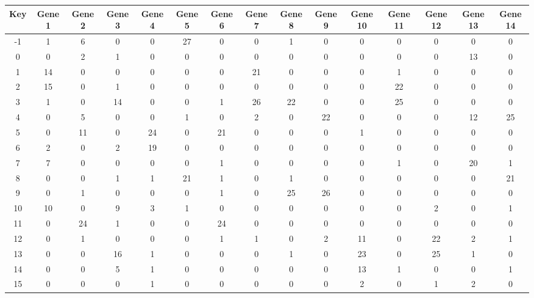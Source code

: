 \begin{tabular}{|c|c|c|c|c|c|c|c|c|c|c|c|c|c|c|}
\hline
Key & Gene 1 & Gene 2 & Gene 3 & Gene 4 & Gene 5 & Gene 6 & Gene 7 & Gene 8 & Gene 9 & Gene 10 & Gene 11 & Gene 12 & Gene 13 & Gene 14 \\
\hline
-1 & 1 & 6 & 0 & 0 & 27 & 0 & 0 & 1 & 0 & 0 & 0 & 0 & 0 & 0 \\
0 & 0 & 2 & 1 & 0 & 0 & 0 & 0 & 0 & 0 & 0 & 0 & 0 & 13 & 0 \\
1 & 14 & 0 & 0 & 0 & 0 & 0 & 21 & 0 & 0 & 0 & 1 & 0 & 0 & 0 \\
2 & 15 & 0 & 1 & 0 & 0 & 0 & 0 & 0 & 0 & 0 & 22 & 0 & 0 & 0 \\
3 & 1 & 0 & 14 & 0 & 0 & 1 & 26 & 22 & 0 & 0 & 25 & 0 & 0 & 0 \\
4 & 0 & 5 & 0 & 0 & 1 & 0 & 2 & 0 & 22 & 0 & 0 & 0 & 12 & 25 \\
5 & 0 & 11 & 0 & 24 & 0 & 21 & 0 & 0 & 0 & 1 & 0 & 0 & 0 & 0 \\
6 & 2 & 0 & 2 & 19 & 0 & 0 & 0 & 0 & 0 & 0 & 0 & 0 & 0 & 0 \\
7 & 7 & 0 & 0 & 0 & 0 & 1 & 0 & 0 & 0 & 0 & 1 & 0 & 20 & 1 \\
8 & 0 & 0 & 1 & 1 & 21 & 1 & 0 & 1 & 0 & 0 & 0 & 0 & 0 & 21 \\
9 & 0 & 1 & 0 & 0 & 0 & 1 & 0 & 25 & 26 & 0 & 0 & 0 & 0 & 0 \\
10 & 10 & 0 & 9 & 3 & 1 & 0 & 0 & 0 & 0 & 0 & 0 & 2 & 0 & 1 \\
11 & 0 & 24 & 1 & 0 & 0 & 24 & 0 & 0 & 0 & 0 & 0 & 0 & 0 & 0 \\
12 & 0 & 1 & 0 & 0 & 0 & 1 & 1 & 0 & 2 & 11 & 0 & 22 & 2 & 1 \\
13 & 0 & 0 & 16 & 1 & 0 & 0 & 0 & 1 & 0 & 23 & 0 & 25 & 1 & 0 \\
14 & 0 & 0 & 5 & 1 & 0 & 0 & 0 & 0 & 0 & 13 & 1 & 0 & 0 & 1 \\
15 & 0 & 0 & 0 & 1 & 0 & 0 & 0 & 0 & 0 & 2 & 0 & 1 & 2 & 0 \\
\hline
\end{tabular}